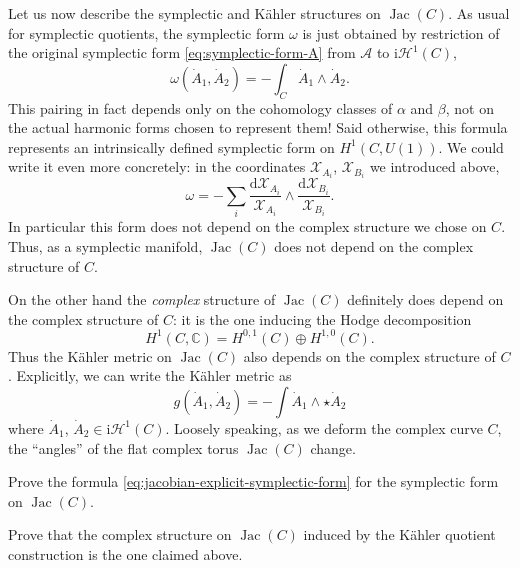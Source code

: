 \documentclass[12pt,letterpaper,reqno]{article}
\numberwithin{equation}{section}
\newcommand{\cH}{\ensuremath{\mathcal H}}
\newcommand{\cX}{\ensuremath{\mathcal X}}
\newcommand{\cA}{\ensuremath{\mathcal A}}
\newcommand{\C}{\ensuremath{\mathbb C}}
\newcommand{\kahler}{K\"ahler\xspace}
\newcommand{\I}{{\mathrm i}}
\newcommand{\de}{\mathrm{d}}
\newcommand{\ti}[1]{\textit{#1}}
\DeclareMathOperator{\Jac}{Jac}
\newcommand{\insfig}[2]{

\medskip
\noindent
\begin{minipage}{\linewidth}

\makebox[\linewidth]{\texttt{[image: figures/\#1-crop.pdf]}}

\end{minipage}
\medskip

}
\begin{document}
\begin{example}[Jacobians]
Let us now describe the symplectic and \kahler structures
on $\Jac(C)$.
As usual for symplectic quotients,
the symplectic form $\omega$ is just obtained by
restriction of the original symplectic form \eqref{eq:symplectic-form-A}
from $\cA$ to $\I \cH^1(C)$,
\begin{equation} \label{eq:symplectic-form-jac}
  \omega(\dot{A}_1, \dot{A}_2) = - \int_C \dot{A}_1 \wedge \dot{A}_2.
\end{equation}
This pairing in fact depends only on the cohomology classes of
$\alpha$ and $\beta$, not on the actual harmonic forms
chosen to represent them! Said otherwise, this formula represents
an intrinsically defined symplectic form on $H^1(C,U(1))$.
We could write it even more concretely: in the coordinates
$\cX_{A_i}$, $\cX_{B_i}$ we introduced above,
\begin{equation} \label{eq:jacobian-explicit-symplectic-form}
	\omega = - \sum_i \frac{\de \cX_{A_i}}{\cX_{A_i}} \wedge \frac{\de \cX_{B_i}}{\cX_{B_i}}.
\end{equation}
In particular this form does not depend on the complex structure
we chose on $C$.
Thus, as a symplectic manifold, $\Jac(C)$ does not depend on
the complex structure of $C$.

\insfig{higgs-bundles-14}{0.9}

On the other hand the
\ti{complex} structure of $\Jac(C)$
definitely does depend on the complex
structure of $C$: it is the one inducing the
Hodge decomposition
\begin{equation}
  H^1(C,\C) = H^{0,1}(C) \oplus H^{1,0}(C).
\end{equation}
Thus the \kahler metric on $\Jac(C)$
also depends on the complex structure of $C$.
Explicitly, we can write the \kahler metric as
\begin{equation}
  g(\dot{A}_1, \dot{A}_2) = - \int \dot{A}_1 \wedge \star \dot{A}_2
\end{equation}
where $\dot{A}_1$, $\dot{A}_2 \in \I \cH^1(C)$.
Loosely speaking, as we deform the complex curve $C$, the ``angles'' of
the flat complex torus $\Jac(C)$ change.
\end{example}

\begin{exercise} Prove the formula \eqref{eq:jacobian-explicit-symplectic-form}
for the symplectic form on $\Jac(C)$.
\end{exercise}

\begin{exercise}
Prove that the complex structure on $\Jac(C)$
induced by the \kahler quotient construction is the
one claimed above.
\end{exercise}
\end{document}
